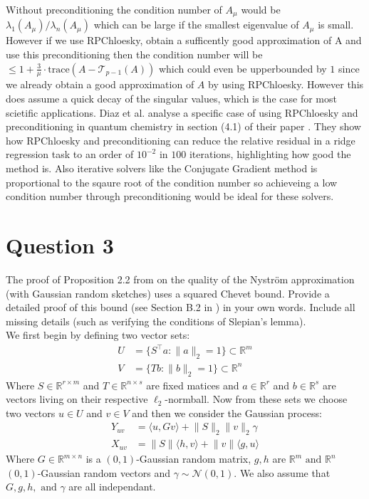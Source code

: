 Without preconditioning the condition number of $A_{\mu}$ would be $\lambda_1(A_{\mu}) / \lambda_n(A_{\mu})$ which can
be large if the smallest eigenvalue of $A_{\mu}$ is small. However if we use RPChloesky, obtain a sufficently good
approximation of A and use this preconditioning then the condition number will be $\leq 1 +
\frac{3}{\mu}\cdot\text{trace}(A - \mathcal{T}_{p-1}(A))$ which could even be upperbounded by $1$ since we already
obtain a good approximation of $A$ by using RPChloesky. However this does assume a quick decay of the singular values,
which is the case for most scietific applications. Diaz et al. analyse a specific case of using RPChloesky and
preconditioning in quantum chemistry in section (4.1) of their paper
\cite{díaz2024robustrandomizedpreconditioningkernel}. They show how RPChloesky and preconditioning can reduce the
relative residual in a ridge regression task to an order of $10^{-2}$ in $100$ iterations, highlighting how good the
method is. Also iterative solvers like the Conjugate Gradient method is proportional to the sqaure root of the condition
number so achieveing a low condition number through preconditioning would be ideal for these solvers.

\section{Question 3}
The proof of Proposition 2.2 from \cite{frangella2021randomizednystrompreconditioning} on the quality of the Nyström
approximation (with Gaussian random sketches) uses a squared Chevet bound. Provide a detailed proof of this bound (see
Section B.2 in \cite{frangella2021randomizednystrompreconditioning}) in your own words. Include all missing details
(such as verifying the conditions of Slepian’s lemma). \\

We first begin by defining two vector sets:
\begin{align*}
    U &= \{ S^{\top}a : \lVert a \rVert_2 = 1 \} \subset \mathbb{R}^m \\
    V &= \{ Tb : \lVert b \rVert_2 = 1\} \subset \mathbb{R}^n 
\end{align*}
Where $S \in \mathbb{R}^{r \times m}$ and $T \in \mathbb{R}^{n \times s}$ are fixed matices and $a \in \mathbb{R}^{r}$
and $b \in \mathbb{R}^{s}$ are vectors living on their respective $\ell_2$-normball. Now from these sets we choose two
vectors $u \in U$ and $v \in V$ and then we consider the Gaussian process:
\begin{align*}
    Y_{uv} &= \langle u, Gv \rangle + \lVert S \rVert_2 \lVert v \rVert_2 \gamma \\
    X_{uv} &= \lVert S \rVert \langle h, v \rangle + \lVert v \rVert \langle g, u \rangle
\end{align*}
Where $G \in \mathbb{R}^{m \times n}$ is a $(0, 1)$-Gaussian random matrix, $g, h$ are $\mathbb{R}^{m} \text{ and }
\mathbb{R}^{n}$ $(0, 1)$-Gaussian random vectors and $\gamma \sim \mathcal{N}(0, 1)$. We also assume that $G, g, h,
\text{ and } \gamma$ are all independant. \\


